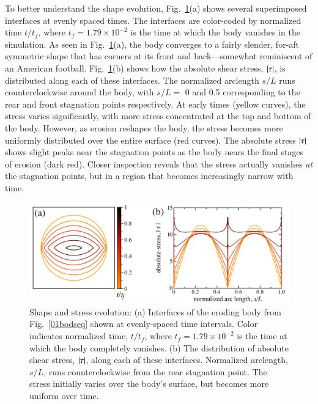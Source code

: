 \documentclass[preprint, 10pt]{elsarticle}
\begin{document}
To better understand the shape evolution, Fig.~\ref{shrink_intface}(a) shows several superimposed interfaces at evenly spaced times. The interfaces are color-coded by normalized time $t/t_f$, where $t_f = 1.79 \times 10^{-2}$ is the time at which the body vanishes in the simulation. As seen in Fig.~\ref{shrink_intface}(a), the body converges to a fairly slender, for-aft symmetric shape that has corners at its front and back---somewhat reminiscent of an American football.  Fig.~\ref{shrink_intface}(b) shows how the absolute shear stress, $\lvert \tau \rvert$, is distributed along each of these interfaces. The normalized arclength $s/L$ runs counterclockwise around the body, with $s/L = $ 0 and 0.5 corresponding to the rear and front stagnation points respectively. At early times (yellow curves), the stress varies significantly, with more stress concentrated at the top and bottom of the body. However, as erosion reshapes the body, the stress becomes more uniformly distributed over the entire surface (red curves). The absolute stress $\lvert \tau \rvert$ shows slight peaks near the stagnation points as the body nears the final stages of erosion (dark red). Closer inspection reveals that the stress actually vanishes {\em at} the stagnation points, but in a region that becomes increasingly narrow with time.


\begin{figure}%
\begin{center}
\includegraphics[width = 0.8 \textwidth]{./figs/shrink_intface.pdf}
\caption{
Shape and stress evolution: (a) Interfaces of the eroding body from Fig.~\ref{01bodseq} shown at evenly-spaced time intervals. Color indicates normalized time, $t/t_f$, where $t_f = 1.79 \times 10^{-2}$ is the time at which the body completely vanishes. (b) The distribution of absolute shear stress, $\lvert \tau \rvert$, along each of these interfaces. Normalized arclength, $s/L$, runs counterclockwise from the rear stagnation point. The stress initially varies over the body's surface, but becomes more uniform over time.}
\label{shrink_intface}
\end{center}
\end{figure}
\end{document}
